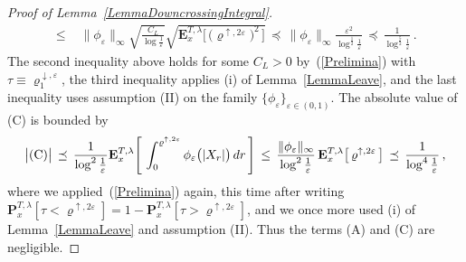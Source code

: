 \documentclass[10pt]{article}
\numberwithin{equation}{section}
\theoremstyle{definition}
\begin{document}
\begin{proof} [Proof of Lemma~\ref{LemmaDowncrossingIntegral}]
\begin{align}
   \,\leq \, &\, \|\phi_{\varepsilon}\|_{\infty} \sqrt{ \frac{ C_{L}  }{\log \frac{1}{\varepsilon}  }  }  \sqrt{\mathbf{E}^{T,\lambda}_{x}\Big[ \,\big(\varrho^{\uparrow,2\varepsilon} \big)^2 \,\Big] }   \,\preceq  \, \|\phi_{\varepsilon}\|_{\infty} \frac{  \varepsilon^2 }{\log^{\frac{1}{2}} \frac{1}{\varepsilon}  }  \, \preceq \,\frac{ 1 }{\log^{\frac{5}{2}} \frac{1}{\varepsilon}  }  \,.
\end{align}
The second inequality above holds for some $C_{L} >0$ by~(\ref{Prelimina}) with $\tau\equiv \varrho^{\downarrow,\varepsilon}_1 $, the third inequality applies (i) of Lemma~\ref{LemmaLeave}, and the last inequality uses assumption (II) on the family $\{\phi_{\varepsilon}  \}_{\varepsilon\in (0,1) }$. The absolute value of (C) is bounded by
\begin{align}\label{Pip2}
\big|\textup{(C)}\big| \,\preceq \,\frac{1 }{\log^2 \frac{1}{\varepsilon}  }\mathbf{E}^{T,\lambda}_{x}\Bigg[ \,\int_{ 0}^{\varrho^{\uparrow,2\varepsilon} }      \phi_{\varepsilon}\big(|X_r|\big)\,dr \, \Bigg]   \,\leq  \,\frac{\|\phi_{\varepsilon}\|_{\infty}  }{\log^2 \frac{1}{\varepsilon}  }\,\mathbf{E}^{T,\lambda}_{x}\big[ \,\varrho^{\uparrow,2\varepsilon} \,\big]\, \preceq \,\frac{ 1 }{\log^{4} \frac{1}{\varepsilon}  }\,,
\end{align}
where we  applied~(\ref{Prelimina}) again, this time after writing $\mathbf{P}^{T,\lambda}_{x}[  \tau <\varrho^{\uparrow, 2\varepsilon}    ]=1-\mathbf{P}^{T,\lambda}_{x}[  \tau >\varrho^{\uparrow, 2\varepsilon}    ] $, and we once more used (i) of Lemma~\ref{LemmaLeave} and assumption (II).  Thus the terms (A) and (C) are negligible.


\end{proof}
\end{document}
